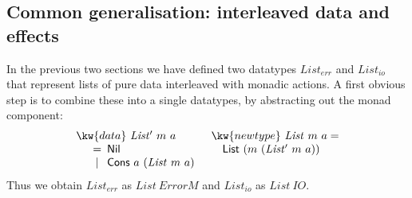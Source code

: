 

\subsection{Common generalisation: interleaved data and effects}

In the previous two sections we have defined two datatypes
$\mathit{List_{err}}$ and $\mathit{List_{io}}$ that represent lists of
pure data interleaved with monadic actions. A first obvious step is to
combine these into a single datatypes, by abstracting out the monad
component:
\begin{displaymath}
  \begin{array}{ll}
    \kw{data}~\mathit{List'}~m~a
    &
    \kw{newtype}~\mathit{List}~m~a = 
    \\
    \quad
    \begin{array}[t]{c@{\hspace{0.5em}}l}
      = & \mathsf{Nil} \\
      | & \mathsf{Cons}~a~(\mathit{List}~m~a) \\
    \end{array}
    &
    \quad \mathsf{List}~(m~(\mathit{List'}~m~a))
  \end{array}
\end{displaymath}
Thus we obtain $\mathit{List_{err}}$ as
$\mathit{List}~\mathit{ErrorM}$ and $\mathit{List_{io}}$ as
$\mathit{List}~\mathit{IO}$.

